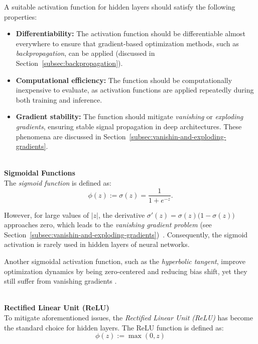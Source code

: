 A suitable activation function for hidden layers should satisfy the following properties:\begin{itemize}    
    \item \textbf{Differentiability:} The activation function should be differentiable almost everywhere to ensure that gradient-based optimization methods, such as \emph{backpropagation}, can be applied (discussed in Section~\ref{subsec:backpropagation}). 
    
    \item \textbf{Computational efficiency:} The function should be computationally inexpensive to evaluate, as activation functions are applied repeatedly during both training and inference.
    
    \item \textbf{Gradient stability:} The function should mitigate \emph{vanishing} or \emph{exploding gradients}, ensuring stable signal propagation in deep architectures. These phenomena are discussed in Section~\ref{subsec:vanishin-and-exploding-gradients}.
\end{itemize}


\textbf{\\Sigmoidal Functions\\}  
The \emph{sigmoid function} is defined as:
\begin{equation*}
    \phi(z) := \sigma(z) = \frac{1}{1 + e^{-z}}.
\end{equation*}

However, for large values of $|z|$, the derivative $\sigma'(z) = \sigma(z)\bigl(1 - \sigma(z)\bigr)$ approaches zero, which leads to the \emph{vanishing gradient problem} (see Section~\ref{subsec:vanishin-and-exploding-gradients})~\cite{goodfellow2016}. Consequently, the sigmoid activation is rarely used in hidden layers of neural networks.

Another sigmoidal activation function, such as the \emph{hyperbolic tangent}, improve optimization dynamics by being zero-centered and reducing bias shift, yet they still suffer from vanishing gradients \cite{goodfellow2016}. 

\textbf{\\Rectified Linear Unit (ReLU)\\}  
To mitigate aforementioned issues, the \emph{Rectified Linear Unit (ReLU)} has become the standard choice for hidden layers. The ReLU function is defined as:
\begin{equation*}
    \phi(z) := \max(0, z)
\end{equation*}

